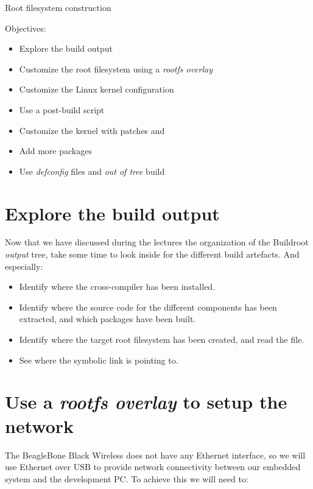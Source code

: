 \subchapter
{Root filesystem construction}
{Objectives:
  \begin{itemize}
  \item Explore the build output
  \item Customize the root filesystem using a {\em rootfs overlay}
  \item Customize the Linux kernel configuration
  \item Use a post-build script
  \item Customize the kernel with patches and
  \item Add more packages
  \item Use {\em defconfig} files and {\em out of tree} build
  \end{itemize}
}

\section{Explore the build output}

Now that we have discussed during the lectures the organization of the
Buildroot {\em output} tree, take some time to look inside
 for the different build artefacts. And especially:

\begin{itemize}

\item Identify where the cross-compiler has been installed.

\item Identify where the source code for the different components has
  been extracted, and which packages have been built.

\item Identify where the target root filesystem has been created, and
  read the  file.

\item See where the  symbolic link is pointing to.

\end{itemize}

\section{Use a {\em rootfs overlay} to setup the network}

The BeagleBone Black Wireless does not have any Ethernet interface, so
we will use Ethernet over USB to provide network connectivity between
our embedded system and the development PC. To achieve this we will
need to:

